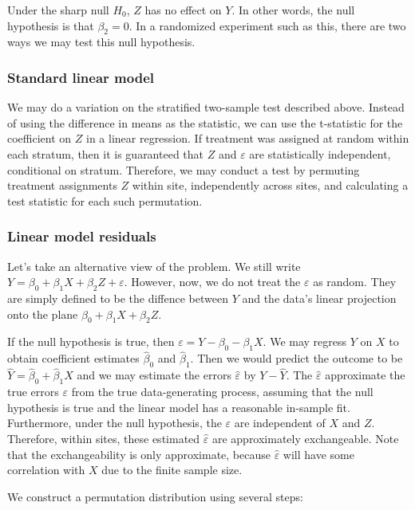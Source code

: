 \documentclass[11pt]{article}
\newcommand{\todo}[1]{{\color{red}{TO DO: \sc #1}}}
\begin{document}
Under the sharp null $H_0$, $Z$ has no effect on $Y$.
In other words, the null hypothesis is that $\beta_2 = 0$.
In a randomized experiment such as this, there are two ways we may test this null hypothesis.

\subsubsection{Standard linear model}
We may do a variation on the stratified two-sample test described above.
Instead of using the difference in means as the statistic, we can use the t-statistic for the coefficient on $Z$ in a linear regression.
If treatment was assigned at random within each stratum, then it is guaranteed that $Z$ and $\varepsilon$ are statistically independent, conditional on stratum.
Therefore, we may conduct a test by permuting treatment assignments $Z$ within site, independently across sites, and calculating a test statistic for each such permutation.

\subsubsection{Linear model residuals}

Let's take an alternative view of the problem.
We still write $Y = \beta_0 + \beta_1 X + \beta_2 Z + \varepsilon$.
However, now, we do not treat the $\varepsilon$ as random.
They are simply defined to be the diffence between $Y$ and the data's linear projection onto the plane $\beta_0 + \beta_1 X + \beta_2 Z$.

If the null hypothesis is true, then $\varepsilon = Y - \beta_0 - \beta_1X$.
We may regress $Y$ on $X$ to obtain coefficient estimates $\hat{\beta}_0$ and $\hat{\beta}_1$.
Then we would predict the outcome to be $\hat{Y} = \hat{\beta}_0 + \hat{\beta}_1X$
and we may estimate the errors $\hat{\varepsilon}$ by $Y - \hat{Y}$.
The $\hat{\varepsilon}$ approximate the true errors $\varepsilon$ from the true data-generating process, assuming that the null hypothesis is true and the linear model has a reasonable in-sample fit.
Furthermore, under the null hypothesis, the $\varepsilon$ are independent of $X$ and $Z$. \todo{ this is false. fix}
Therefore, within sites, these estimated $\hat{\varepsilon}$ are approximately exchangeable.
Note that the exchangeability is only approximate, because $\hat{\varepsilon}$ will have some correlation with $X$ due to the finite sample size. \todo{ fix wording}

We construct a permutation distribution using several steps:
\end{document}

